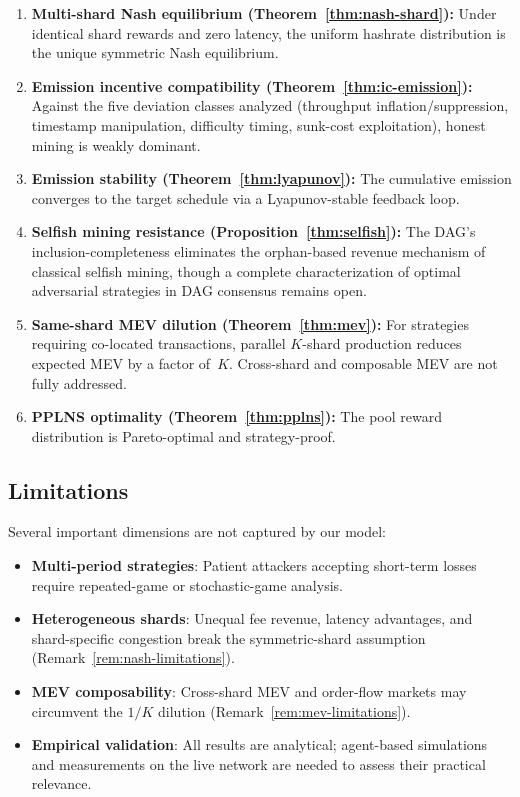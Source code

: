 \documentclass[11pt,a4paper]{article}
\theoremstyle{definition}
\theoremstyle{remark}
\begin{document}
\begin{enumerate}[leftmargin=*]
  \item \textbf{Multi-shard Nash equilibrium (Theorem~\ref{thm:nash-shard}):}
    Under identical shard rewards and zero latency, the uniform hashrate
    distribution is the unique symmetric Nash equilibrium.

  \item \textbf{Emission incentive compatibility (Theorem~\ref{thm:ic-emission}):}
    Against the five deviation classes analyzed (throughput inflation/suppression,
    timestamp manipulation, difficulty timing, sunk-cost exploitation),
    honest mining is weakly dominant.

  \item \textbf{Emission stability (Theorem~\ref{thm:lyapunov}):}
    The cumulative emission converges to the target schedule via a
    Lyapunov-stable feedback loop.

  \item \textbf{Selfish mining resistance (Proposition~\ref{thm:selfish}):}
    The DAG's inclusion-completeness eliminates the orphan-based revenue
    mechanism of classical selfish mining, though a complete characterization
    of optimal adversarial strategies in DAG consensus remains open.

  \item \textbf{Same-shard MEV dilution (Theorem~\ref{thm:mev}):}
    For strategies requiring co-located transactions, parallel $K$-shard
    production reduces expected MEV by a factor of~$K$.
    Cross-shard and composable MEV are not fully addressed.

  \item \textbf{PPLNS optimality (Theorem~\ref{thm:pplns}):}
    The pool reward distribution is Pareto-optimal and strategy-proof.
\end{enumerate}

\subsection{Limitations}

Several important dimensions are not captured by our model:
\begin{itemize}[nosep]
  \item \textbf{Multi-period strategies}: Patient attackers accepting
    short-term losses require repeated-game or stochastic-game analysis.
  \item \textbf{Heterogeneous shards}: Unequal fee revenue, latency
    advantages, and shard-specific congestion break the symmetric-shard
    assumption (Remark~\ref{rem:nash-limitations}).
  \item \textbf{MEV composability}: Cross-shard MEV and order-flow markets
    may circumvent the $1/K$ dilution (Remark~\ref{rem:mev-limitations}).
  \item \textbf{Empirical validation}: All results are analytical;
    agent-based simulations and measurements on the live network are
    needed to assess their practical relevance.
\end{itemize}
\end{document}
